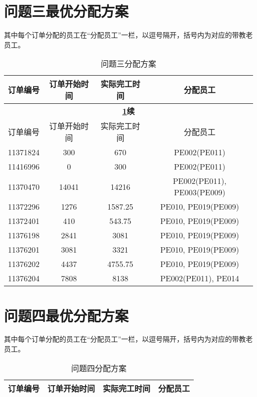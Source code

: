 \begin{appendices}
\begin{center}
\begin{longtable}{|c|c|c|c|c|c|}
\end{longtable}
\end{center}

\section{问题三最优分配方案}
其中每个订单分配的员工在“分配员工”一栏，以逗号隔开，括号内为对应的带教老员工。
\begin{center}
\begin{longtable}{|c|c|c|c|}
\caption{问题三分配方案} 
\label{tab:problem3}\\
\hline
订单编号     & 订单开始时间 & 实际完工时间 & 分配员工 \\ \hline
\endfirsthead

\multicolumn{4}{c}{\textbf{\cref{tab:problem3}续}} \\
\hline
订单编号     & 订单开始时间 & 实际完工时间 & 分配员工 \\
\hline
\endhead

11371824 & 300   & 670    &PE002(PE011)
  \\ \hline
11416996 & 0     & 300   & PE002(PE011)
   \\ \hline
11370470 & 14041 & 14216  &PE002(PE011), PE003(PE009)
  \\ \hline
11372296 & 1276  & 1587.25&PE010, PE019(PE009)
  \\ \hline
11372401 & 410   & 543.75 &PE010, PE019(PE009)
  \\ \hline
11376198 & 2841  & 3081  &PE010, PE019(PE009)
   \\ \hline
11376201 & 3081  & 3321  &PE010, PE019(PE009)
   \\ \hline
11376202 & 4437  & 4755.75 &PE010, PE019(PE009)
 \\ \hline
11376204 & 7808  & 8138  &PE002(PE011), PE014
   \\ \hline


\end{longtable}
\end{center}


\section{问题四最优分配方案}
其中每个订单分配的员工在“分配员工”一栏，以逗号隔开，括号内为对应的带教老员工。
\begin{center}
\begin{longtable}{|c|c|c|c|}
\caption{问题四分配方案} 
\label{tab:problem4}\\
\hline
订单编号     & 订单开始时间 & 实际完工时间 & 分配员工 \\ \hline
\endfirsthead


\end{longtable}
\end{center}
\end{appendices}
